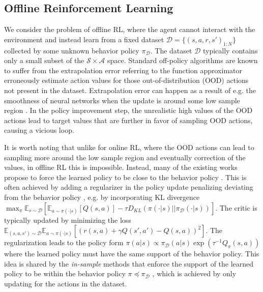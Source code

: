 \documentclass{article}
\newcommand{\AdaBracket}[1]{\left(#1\right)}
\newcommand{\AdaRectBracket}[1]{\left[#1\right]}
\newcommand{\expectation}[2]{\mathbb{E}_{#1}\AdaRectBracket{#2}}
\newcommand{\KLany}[2]{D_{\!K\!L}\!\left(#1 \left|  \right| #2 \right)}
\newcommand{\datasetPolicy}{\pi_{\mathcal{D}}}
\begin{document}
\subsection{Offline Reinforcement Learning}

We consider the problem of offline RL, where the agent cannot interact with the environment and instead learn from a fixed dataset $\mathcal{D} = \{(s,a,r,s')_{1:N}\}$ collected by some unknown behavior policy $\datasetPolicy$.
The dataset $\mathcal{D}$ typically contains only a small subset of the $\mathcal{S}\times \mathcal{A}$ space.
Standard off-policy algorithms are known to suffer from the extrapolation error referring to the function approximator erroneously estimate action values for those out-of-distribution (OOD) actions not present in the dataset.
Extrapolation error can happen as a result of e.g. the smoothness of neural networks when the update is around some low sample region \cite{Gulcehre2021-regularizedBehavior}.
In the policy improvement step, the unrealistic high values of the OOD actions lead to target values that are further in favor of sampling OOD actions, causing a vicious loop. 

It is worth noting that unlike for online RL, where the OOD actions can lead to sampling more around the low sample region and eventually correction of the values, in offline RL this is impossible.
Instead, many of the existing works propose to force the learned policy to be close to the behavior policy \cite{Dadashi2021-pseudoMetricOffline,Fujimoto2019-InSampleMax,Fujimoto2021-minimalist,Nair2021-awac}.
This is often achieved by adding a regularizer in the policy update penalizing deviating from the behavior policy \cite{Ghasemipour2021-EMaQ,Kumar2019-BootstrapErrorQlearningMMD,Jaques2020-OfflineDialog,Wu2020-BehaviorRegularizedAC}, e.g. by incorporating KL divergence $\max_{\pi}\expectation{s\sim\mathcal{D}}{\expectation{a\sim\pi(\cdot|s)}{Q(s,a)} - \tau\KLany{\pi(\cdot|s)}{\datasetPolicy(\cdot|s)}}$.
The critic is typically updated by minimizing the loss $\mathbb{E}_{(s,a,s')\sim \mathcal{D}}\expectation{a\sim\pi(\cdot|s)}{\AdaBracket{ r(s,a) + \gamma Q(s',a') - Q(s,a)}^2}$.
The regularization leads to the policy form $\pi(a|s)\propto\datasetPolicy(a|s)\exp\AdaBracket{\tau^{-1}Q_{\pi}(s,a)}$ where the learned policy must have the same support of the behavior policy.
This idea is shared by the \emph{in-sample} methods that enforce the support of the learned policy to be within the behavior policy $\pi \preceq \datasetPolicy$ \cite{Fujimoto2019-InSampleMax,Kostrikov2022-implicitQlearning,Xiao2023-InSampleSoftmax}, which is achieved by only updating for the actions in the dataset.
\end{document}
